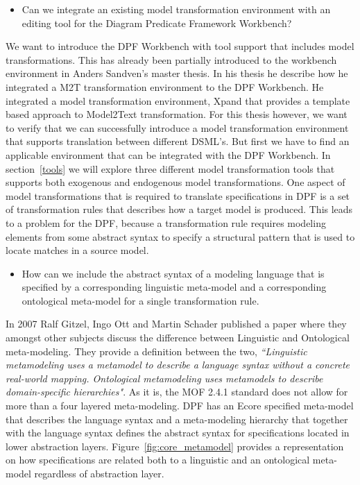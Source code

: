 \begin{itemize}
  
  \item Can we integrate an existing model transformation environment with an
  editing tool for the Diagram Predicate Framework Workbench?

\end{itemize}

We want to introduce the DPF Workbench with tool support that includes model
transformations. This has already been partially introduced to the workbench
environment in Anders Sandven\cite{Sandven_thesis}'s master thesis. In his
thesis he describe how he integrated a M2T transformation environment to the DPF
Workbench. He integrated a model transformation environment, Xpand\cite{Xpand}
that provides a template based approach to Model2Text transformation. For this
thesis however, we want to verify that we can successfully introduce a model
transformation environment that supports translation between different DSML's.
But first we have to find an applicable environment that can be integrated with
the DPF Workbench. In section~\ref{tools} we will explore three different
model transformation tools that supports both exogenous and endogenous model
transformations. One aspect of model transformations that is required to
translate specifications in DPF is a set of transformation rules that describes
how a target model is produced. This leads to a problem for the DPF, because a
transformation rule requires modeling elements from some abstract syntax to
specify a structural pattern that is used to locate matches in a source model. 

\begin{itemize}  

  \item How can we include the abstract syntax of a modeling language that is
  specified by a corresponding linguistic meta-model and a corresponding 
  ontological meta-model for a single transformation rule.

\end{itemize}

In 2007 Ralf Gitzel, Ingo Ott and Martin Schader published a paper where they
amongst other subjects discuss the difference between Linguistic and
Ontological meta-modeling. They provide a definition between the two, 
\textit{``Linguistic metamodeling uses a metamodel to describe a language syntax
without a concrete real-world mapping. Ontological metamodeling uses metamodels
to describe domain-specific hierarchies"}\cite{gitzel2007ontological}. As it is,
the MOF 2.4.1 standard does not allow for more than a four layered
meta-modeling. DPF has an Ecore specified meta-model that describes the
language syntax and a meta-modeling hierarchy that together with the language
syntax defines the abstract syntax for specifications located in lower
abstraction layers. Figure~\ref{fig:core_metamodel} provides a representation on how
specifications are related both to a linguistic and an ontological meta-model
regardless of abstraction layer.

